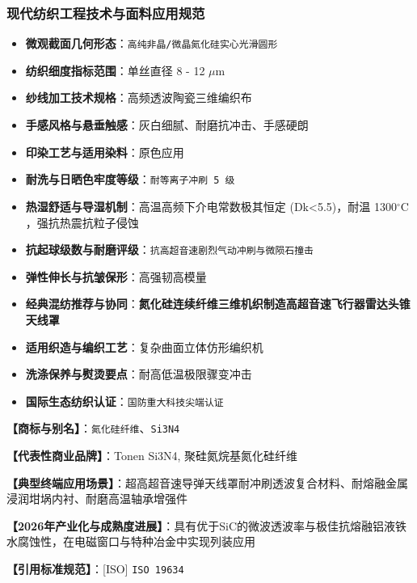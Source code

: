 \documentclass[11pt,openright,twoside,UTF8]{ctexbook}
\begin{document}
\subsubsection*{现代纺织工程技术与面料应用规范}
\begin{itemize} \setlength{\itemsep}{2pt}
    \item \textbf{微观截面几何形态}：\texttt{高纯非晶/微晶氮化硅实心光滑圆形}
    \item \textbf{纺织细度指标范围}：单丝直径 8 - 12 $\mu$m
    \item \textbf{纱线加工技术规格}：高频透波陶瓷三维编织布
    \item \textbf{手感风格与悬垂触感}：灰白细腻、耐磨抗冲击、手感硬朗
    \item \textbf{印染工艺与适用染料}：原色应用
    \item \textbf{耐洗与日晒色牢度等级}：\texttt{耐等离子冲刷 5 级}
    \item \textbf{热湿舒适与导湿机制}：高温高频下介电常数极其恒定 (Dk\textless{}5.5)，耐温 1300$^\circ\mathrm{C}$，强抗热震抗粒子侵蚀
    \item \textbf{抗起球级数与耐磨评级}：\texttt{抗高超音速剧烈气动冲刷与微陨石撞击}
    \item \textbf{弹性伸长与抗皱保形}：高强韧高模量
    \item \textbf{经典混纺推荐与协同}：\textbf{氮化硅连续纤维三维机织制造高超音速飞行器雷达头锥天线罩}
    \item \textbf{适用织造与编织工艺}：复杂曲面立体仿形编织机
    \item \textbf{洗涤保养与熨烫要点}：耐高低温极限骤变冲击
    \item \textbf{国际生态纺织认证}：\texttt{国防重大科技尖端认证}
\end{itemize}
\vspace{0.2cm}

\noindent\textbf{【商标与别名】}：\texttt{氮化硅纤维}、\texttt{Si3N4}\par
\noindent\textbf{【代表性商业品牌】}：Tonen Si3N4, 聚硅氮烷基氮化硅纤维\par
\noindent\textbf{【典型终端应用场景】}：超高超音速导弹天线罩耐冲刷透波复合材料、耐熔融金属浸润坩埚内衬、耐磨高温轴承增强件\par
\noindent\textbf{【2026年产业化与成熟度进展】}：具有优于SiC的微波透波率与极佳抗熔融铝液铁水腐蚀性，在电磁窗口与特种冶金中实现列装应用\par
\noindent\textbf{【引用标准规范】}：[ISO] \texttt{ISO 19634}\par
\vspace{0.5cm}
\end{document}

